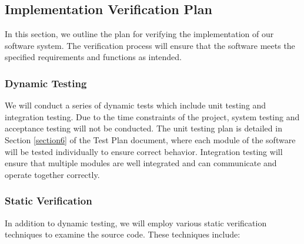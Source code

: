 \documentclass[12pt, titlepage]{article}
\begin{document}





\subsection{Implementation Verification Plan} \label{section4.5}

In this section, we outline the plan for verifying the implementation of our software system.
The verification process will ensure that the software meets the specified requirements and functions as intended.

\subsubsection{Dynamic Testing}
We will conduct a series of dynamic tests which include unit testing and integration testing. Due to the time constraints of the project, system testing and acceptance testing will not be conducted.
The unit testing plan is detailed in Section \ref{section6} of the Test Plan document, where each module of the software will be tested individually to ensure correct behavior.
Integration testing will ensure that multiple modules are well integrated and can communicate and operate together correctly.

\subsubsection{Static Verification}
In addition to dynamic testing, we will employ various static verification techniques to examine the source code. These techniques include:
\end{document}
